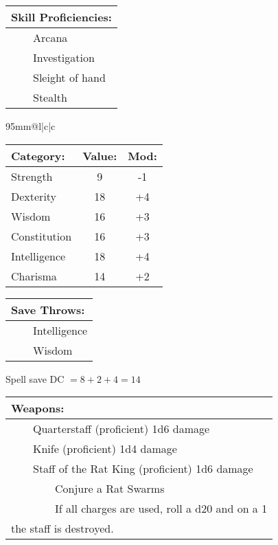 \documentclass[11pt]{article}
\newcommand{\tabitem}{~~\llap{--}~~}
\newcommand{\tabtabitem}{~~~~~~\llap{$\bullet$}~~}
\begin{document}
\begin{multicols}{2}
\vspace{2mm}

\noindent \begin{tabularx}{95mm}{@{}l}
{\Large \textbf{Skill Proficiencies:}} \\
\hline
\tabitem Arcana \\
\tabitem Investigation \\
\tabitem Sleight of hand \\
\tabitem Stealth
		\end{tabularx}

\vspace{4mm}

\noindent \begin{tabularx}{95mm}{@{}l|c|c}
 \\
\hline
		\end{tabularx}
\noindent \begin{tabular}{@{}l|c|c}
\textbf{Category:} 			& \textbf{Value:} 	& \textbf{Mod:} \\
\hline
Strength 					& 9 				& -1 			\\
Dexterity 					& 18 				& +4 			\\
Wisdom 						& 16			 	& +3 			\\
Constitution 				& 16 				& +3 			\\
Intelligence 				& 18 				& +4 			\\
Charisma 					& 14 				& +2
		\end{tabular}

\vspace{4mm}

\noindent \begin{tabularx}{95mm}{@{}l}
{\Large \textbf{Save Throws:}} \\
\hline
\tabitem Intelligence \\
\tabitem Wisdom
		\end{tabularx}
\noindent Spell save DC $= 8 + 2 + 4 = 14$

\vspace{4mm}

\noindent \begin{tabularx}{95mm}{@{}l}
{\Large \textbf{Weapons:}} \\
\hline
\tabitem Quarterstaff (proficient) 1d6 damage \\
\tabitem Knife (proficient) 1d4 damage \\
\tabitem Staff of the Rat King (proficient) 1d6 damage \\
\tabtabitem Conjure a Rat Swarms \\
\tabtabitem If all charges are used, roll a d20 and on a 1 \\ 
the staff is destroyed.
		\end{tabularx}


\end{multicols}
\end{document}
